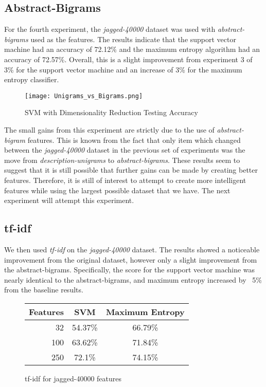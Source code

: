 \subsection{Abstract-Bigrams}
For the fourth experiment, the \emph{jagged-40000} dataset was used with \emph{abstract-bigrams} used as the features.  The results indicate that the support vector machine had an accuracy of 72.12\% and the maximum entropy algorithm had an accuracy of 72.57\%.  Overall, this is a slight improvement from experiment 3 of 3\% for the support vector machine and an increase of 3\% for the maximum entropy classifier.

\begin{figure}[!h]
\begin{center}
\caption{SVM with Dimensionality Reduction Testing Accuracy}
\texttt{[image: Unigrams\_vs\_Bigrams.png]}
\end{center}
\end{figure}

The small gains from this experiment are strictly due to the use of \emph{abstract-bigram} features.  This is known from the fact that only item which changed between the \emph{jagged-40000} dataset in the previous set of experiments was the move from \emph{description-unigrams} to \emph{abstract-bigrams}.  These results seem to suggest that it is still possible that further gains can be made by creating better features. Therefore, it is still of interest to attempt to create more intelligent features while using the largest possible dataset that we have.  The next experiment will attempt this experiment. 

\subsection{tf-idf}
We then used \emph{tf-idf} on the \emph{jagged-40000} dataset.  The results showed a noticeable improvement from the original dataset, however only a slight improvement from the abstract-bigrams.  Specifically, the score for the support vector machine was nearly identical to the abstract-bigrams, and maximum entropy increased by ~5\% from the baseline results.

\begin{figure}[!h]
\begin{center}
\caption{tf-idf for jagged-40000 features}
\begin{tabular}{| r | c | c |}
\hline
\textbf{Features} & \textbf{SVM} & \textbf{Maximum Entropy} \\ \hline
32 & 54.37\% & 66.79\% \\ \hline
100 & 63.62\% & 71.84\% \\ \hline
250 & 72.1\% & 74.15\% \\ \hline
\end{tabular}
\end{center}
\end{figure}

